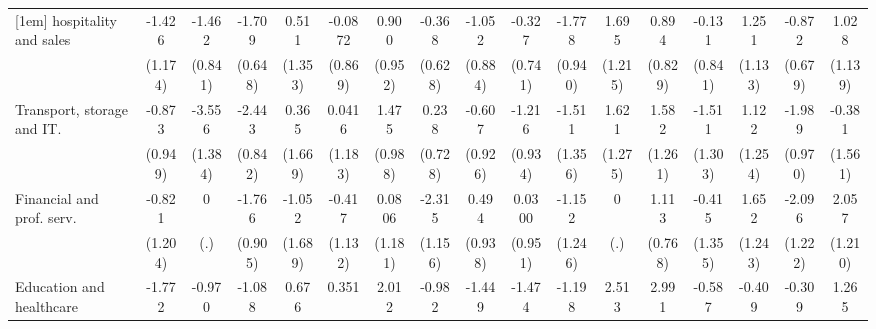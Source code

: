 {\begin{tabular}{l*{16}{c}}
[1em]
hospitality and sales&      -1.426         &      -1.462         &      -1.709\sym{**} &       0.511         &     -0.0872         &       0.900         &      -0.368         &      -1.052         &      -0.327         &      -1.778         &       1.695         &       0.894         &      -0.131         &       1.251         &      -0.872         &       1.028         \\
                    &     (1.174)         &     (0.841)         &     (0.648)         &     (1.353)         &     (0.869)         &     (0.952)         &     (0.628)         &     (0.884)         &     (0.741)         &     (0.940)         &     (1.215)         &     (0.829)         &     (0.841)         &     (1.133)         &     (0.679)         &     (1.139)         \\
[1em]
Transport, storage and IT.&      -0.873         &      -3.556\sym{*}  &      -2.443\sym{**} &       0.365         &      0.0416         &       1.475         &       0.238         &      -0.607         &      -1.216         &      -1.511         &       1.621         &       1.582         &      -1.511         &       1.122         &      -1.989\sym{*}  &      -0.381         \\
                    &     (0.949)         &     (1.384)         &     (0.842)         &     (1.669)         &     (1.183)         &     (0.988)         &     (0.728)         &     (0.926)         &     (0.934)         &     (1.356)         &     (1.275)         &     (1.261)         &     (1.303)         &     (1.254)         &     (0.970)         &     (1.561)         \\
[1em]
Financial and prof. serv.&      -0.821         &           0         &      -1.766         &      -1.052         &      -0.417         &      0.0806         &      -2.315\sym{*}  &       0.494         &      0.0300         &      -1.152         &           0         &       1.113         &      -0.415         &       1.652         &      -2.096         &       2.057         \\
                    &     (1.204)         &         (.)         &     (0.905)         &     (1.689)         &     (1.132)         &     (1.181)         &     (1.156)         &     (0.938)         &     (0.951)         &     (1.246)         &         (.)         &     (0.768)         &     (1.355)         &     (1.243)         &     (1.222)         &     (1.210)         \\
[1em]
Education and healthcare&      -1.772         &      -0.970         &      -1.088         &       0.676         &       0.351         &       2.012\sym{*}  &      -0.982         &      -1.449         &      -1.474         &      -1.198         &       2.513\sym{*}  &       2.991\sym{**} &      -0.587         &      -0.409         &      -0.309         &       1.265         \\

\end{tabular}}
